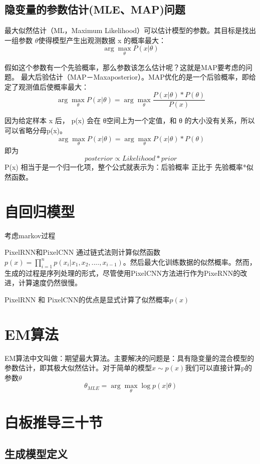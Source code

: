 \documentclass[12pt, a4paper, oneside]{ctexart}
\begin{document}
\subsection{隐变量的参数估计(MLE、MAP)问题}
\par
最大似然估计（ML，Maximum Likelihood）可以估计模型的参数。其目标是找出一组参数 $\theta$使得模型产生出观测数据 x 的概率最大：$$\arg\max\limits_{\theta}P(x|\theta)$$
\par
假如这个参数有一个先验概率，那么参数该怎么估计呢？这就是MAP要考虑的问题。 最大后验估计（MAP－Maxaposterior）。MAP优化的是一个后验概率，即给定了观测值后使概率最大：
$$\arg\max\limits_{\theta}P(x|\theta)=\arg\max\limits_{\theta}\frac{P(x|\theta)*P(\theta)}{P(x)}$$
\par
因为给定样本 x 后， p(x) 会在 θ空间上为一个定值，和 θ 的大小没有关系，所以可以省略分母p(x)。
$$\arg\max\limits_{\theta}P(x|\theta)=\arg\max\limits_{\theta}P(x|\theta)*P(\theta)$$即为
$$posterior\propto Likelihood*prior$$
P(x) 相当于是一个归一化项，整个公式就表示为：后验概率 正比于 先验概率*似然函数。
\section{自回归模型}
考虑markov过程
\par
PixelRNN和PixelCNN 通过链式法则计算似然函数$p(x)=\prod_{i=1}^{n}p(x_i|x_1,x_2,....,x_{i-1})$。然后最大化训练数据的似然概率。然而，生成的过程是序列处理的形式，尽管使用PixelCNN方法进行作为PixeRNN的改进，计算速度仍然很慢。
\par
PixelRNN 和 PixelCNN的优点是显式计算了似然概率$p(x)$

\section{EM算法}
\par
EM算法中文叫做：期望最大算法。主要解决的问题是：具有隐变量的混合模型的参数估计，即其极大似然估计。对于简单的模型$x\sim p(x)$我们可以直接计算p的参数$\theta$
$$\theta_{MLE}=\arg\max\limits_{\theta}\log p(x|\theta)$$ 

\section{白板推导三十节}
\subsection{生成模型定义}
\end{document}
